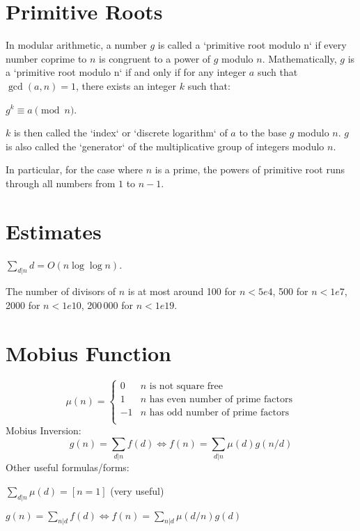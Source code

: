 \section{Primitive Roots}

In modular arithmetic, a number $g$ is called a `primitive root modulo n` if every number coprime to $n$ is congruent to a power of $g$ modulo $n$. Mathematically, $g$ is a `primitive root modulo n` if and only if for any integer $a$ such that $\gcd(a, n) = 1$, there exists an integer $k$ such that:

$g^k \equiv a \pmod n$.

$k$ is then called the `index` or `discrete logarithm` of $a$ to the base $g$ modulo $n$. $g$ is also called the `generator` of the multiplicative group of integers modulo $n$.

In particular, for the case where $n$ is a prime, the powers of primitive root runs through all numbers from $1$ to $n-1$.
\section{Estimates}
	$\sum_{d|n} d = O(n \log \log n)$.

	The number of divisors of $n$ is at most around 100 for $n < 5e4$, 500 for $n < 1e7$, 2000 for $n < 1e10$, 200\,000 for $n < 1e19$.

\section{Mobius Function}
\[
	\mu(n) = \begin{cases} 0 & n \textrm{ is not square free}\\ 1 & n \textrm{ has even number of prime factors}\\ -1 & n \textrm{ has odd number of prime factors}\\\end{cases}
\]
  Mobius Inversion:
  \[ g(n) = \sum_{d|n} f(d) \Leftrightarrow f(n) = \sum_{d|n} \mu(d)g(n/d) \]
  Other useful formulas/forms:

  $ \sum_{d | n} \mu(d) = [ n = 1] $ (very useful)

  $ g(n) = \sum_{n|d} f(d) \Leftrightarrow f(n) = \sum_{n|d} \mu(d/n)g(d)$
